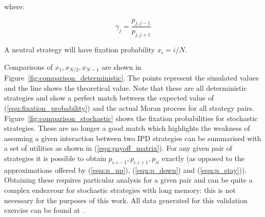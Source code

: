 \documentclass{article}
\begin{document}
where:

\[
\gamma_j = \frac{p_{j, j-1}}{p_{j, j+1}}
\]

A neutral strategy will have fixation probability $x_i = i/N$.

Comparisons of \(x_1, x_{N/2}, x_{N-1}\) are shown in
Figure~\ref{fig:comparison_deterministic}. The points represent the simulated
values and the line shows the theoretical value. Note that these are all
deterministic strategies and show a perfect match between the expected value
of (\ref{equ:fixation_probability}) and the actual Moran process for all
strategy pairs. Figure~\ref{fig:comparison_stochastic} shows the fixation probabilities for
stochastic strategies. These are no longer a good match which highlights the
weakness of assuming a given interaction between two IPD strategies can be
summarised with a set of utilities as shown in
(\ref{equ:payoff_matrix}). For any given pair of strategies it is possible to
obtain \(p_{i,i-1}, p_{i,i+1}, p_{ii}\) exactly (as opposed to the
approximations offered by (\ref{equ:p_up}), (\ref{equ:p_down}) and
(\ref{equ:p_stay})). Obtaining these requires particular analysis for a given
pair and can be quite a complex endeavour for stochastic strategies with long
memory: this is not necessary for the purposes of this work.
All data generated for this validation exercise can be found
at \cite{data}.
\end{document}
